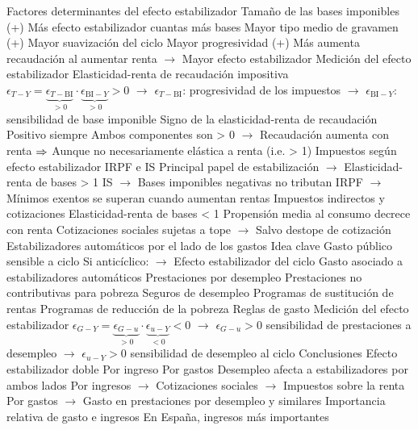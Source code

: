 \documentclass{nuevotema}
\begin{document}
\begin{esquemal}
			\3 Factores determinantes del efecto estabilizador
				\4 Tamaño de las bases imponibles (+)
				\4[] Más efecto estabilizador cuantas más bases
				\4 Mayor tipo medio de gravamen (+)
				\4[] Mayor suavización del ciclo
				\4 Mayor progresividad (+)
				\4[] Más aumenta recaudación al aumentar renta
				\4[] $\to$ Mayor efecto estabilizador
			\3 Medición del efecto estabilizador
				\4 Elasticidad-renta de recaudación impositiva
				\4[] $\epsilon_{T-Y} = \underbrace{\epsilon_{T-\text{BI}}}_{>0} \cdot \underbrace{\epsilon_{\text{BI}-Y}}_{>0} > 0$
				\4[] $\to$ $\epsilon_{T-\text{BI}}$: progresividad de los impuestos
				\4[] $\to$ $\epsilon_{\text{BI}-Y}$: sensibilidad de base imponible
				\4 Signo de la elasticidad-renta de recaudación
				\4[] Positivo siempre
				\4[] Ambos componentes son > 0
				\4[] $\to$ Recaudación aumenta con renta
				\4[] $\Rightarrow$ Aunque no necesariamente elástica a renta (i.e. > 1)
			\3 Impuestos según efecto estabilizador
				\4 IRPF e IS
				\4[] Principal papel de estabilización
				\4[] $\to$ Elasticidad-renta de bases > 1
				\4[] IS
				\4[] $\to$ Bases imponibles negativas no tributan
				\4[] IRPF
				\4[] $\to$ Mínimos exentos se superan cuando aumentan rentas
				\4 Impuestos indirectos y cotizaciones
				\4[] Elasticidad-renta de bases < 1
				\4[] Propensión media al consumo decrece con renta
				\4[] Cotizaciones sociales sujetas a tope
				\4[] $\to$ Salvo destope de cotización
		\2 Estabilizadores automáticos por el lado de los gastos
			\3 Idea clave
				\4 Gasto público sensible a ciclo
				\4[] Si anticíclico:
				\4[] $\to$ Efecto estabilizador del ciclo
				\4 Gasto asociado a estabilizadores automáticos
				\4[] Prestaciones por desempleo
				\4[] Prestaciones no contributivas para pobreza
			\3 Seguros de desempleo
			\3 Programas de sustitución de rentas
			\3 Programas de reducción de la pobreza
			\3 Reglas de gasto
			\3 Medición del efecto estabilizador
				\4[] $\epsilon_{G-Y} = \underbrace{\epsilon_{G-u}}_{>0} \cdot \underbrace{\epsilon_{u-Y}}_{<0} < 0$
				\4[] $\to$ $\epsilon_{G-u} > 0$ sensibilidad de prestaciones a desempleo
				\4[] $\to$ $\epsilon_{u-Y} > 0$ sensibilidad de desempleo al ciclo
		\2 Conclusiones
			\3 Efecto estabilizador doble
				\4 Por ingreso
				\4 Por gastos
			\3 Desempleo afecta a estabilizadores por ambos lados
				\4 Por ingresos
				\4[] $\to$ Cotizaciones sociales
				\4[] $\to$ Impuestos sobre la renta
				\4 Por gastos
				\4[] $\to$ Gasto en prestaciones por desempleo y similares
			\3 Importancia relativa de gasto e ingresos
				\4 En España, ingresos más importantes

\end{esquemal}
\end{document}
